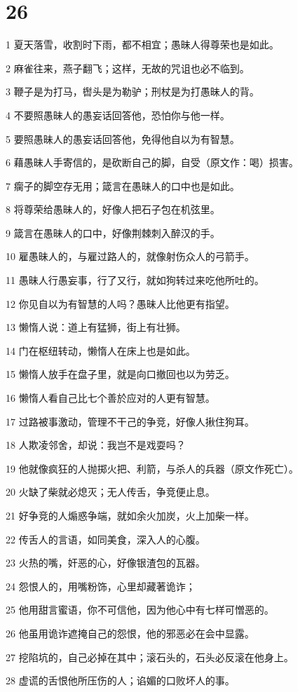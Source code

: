 \chapter{26}

\par 1 夏天落雪，收割时下雨，都不相宜；愚昧人得尊荣也是如此。
\par 2 麻雀往来，燕子翻飞；这样，无故的咒诅也必不临到。
\par 3 鞭子是为打马，辔头是为勒驴；刑杖是为打愚昧人的背。
\par 4 不要照愚昧人的愚妄话回答他，恐怕你与他一样。
\par 5 要照愚昧人的愚妄话回答他，免得他自以为有智慧。
\par 6 藉愚昧人手寄信的，是砍断自己的脚，自受（原文作：喝）损害。
\par 7 瘸子的脚空存无用；箴言在愚昧人的口中也是如此。
\par 8 将尊荣给愚昧人的，好像人把石子包在机弦里。
\par 9 箴言在愚昧人的口中，好像荆棘刺入醉汉的手。
\par 10 雇愚昧人的，与雇过路人的，就像射伤众人的弓箭手。
\par 11 愚昧人行愚妄事，行了又行，就如狗转过来吃他所吐的。
\par 12 你见自以为有智慧的人吗？愚昧人比他更有指望。
\par 13 懒惰人说：道上有猛狮，街上有壮狮。
\par 14 门在枢纽转动，懒惰人在床上也是如此。
\par 15 懒惰人放手在盘子里，就是向口撤回也以为劳乏。
\par 16 懒惰人看自己比七个善於应对的人更有智慧。
\par 17 过路被事激动，管理不干己的争竞，好像人揪住狗耳。
\par 18 人欺凌邻舍，却说：我岂不是戏耍吗？
\par 19 他就像疯狂的人抛掷火把、利箭，与杀人的兵器（原文作死亡）。
\par 20 火缺了柴就必熄灭；无人传舌，争竞便止息。
\par 21 好争竞的人煽惑争端，就如余火加炭，火上加柴一样。
\par 22 传舌人的言语，如同美食，深入人的心腹。
\par 23 火热的嘴，奸恶的心，好像银渣包的瓦器。
\par 24 怨恨人的，用嘴粉饰，心里却藏著诡诈；
\par 25 他用甜言蜜语，你不可信他，因为他心中有七样可憎恶的。
\par 26 他虽用诡诈遮掩自己的怨恨，他的邪恶必在会中显露。
\par 27 挖陷坑的，自己必掉在其中；滚石头的，石头必反滚在他身上。
\par 28 虚谎的舌恨他所压伤的人；谄媚的口败坏人的事。

